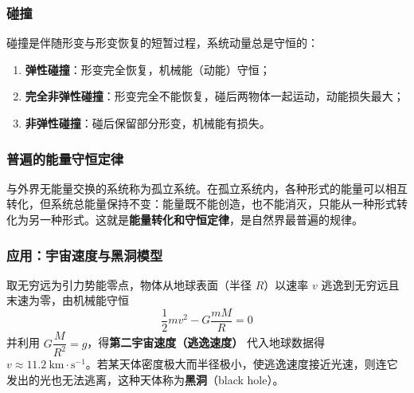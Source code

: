         \subsubsection{碰撞}
        碰撞是伴随形变与形变恢复的短暂过程，系统动量总是守恒的：
        \begin{enumerate}
            \item \textbf{弹性碰撞}：形变完全恢复，机械能（动能）守恒；
            \item \textbf{完全非弹性碰撞}：形变完全不能恢复，碰后两物体一起运动，动能损失最大；
            \item \textbf{非弹性碰撞}：碰后保留部分形变，机械能有损失。
        \end{enumerate}

        \subsubsection{普遍的能量守恒定律}
        与外界无能量交换的系统称为孤立系统。在孤立系统内，各种形式的能量可以相互转化，但系统总能量保持不变：能量既不能创造，也不能消灭，只能从一种形式转化为另一种形式。这就是\textbf{能量转化和守恒定律}，是自然界最普遍的规律。

        \subsubsection{应用：宇宙速度与黑洞模型}
        取无穷远为引力势能零点，物体从地球表面（半径 $R$）以速率 $v$ 逃逸到无穷远且末速为零，由机械能守恒
        \[
        \frac{1}{2}mv^{2}-G\frac{mM}{R}=0
        \]
        并利用 $G\dfrac{M}{R^{2}}=g$，得\textbf{第二宇宙速度（逃逸速度）}
        代入地球数据得 $v\approx11.2\ \mathrm{km\cdot s^{-1}}$。若某天体密度极大而半径极小，使逃逸速度接近光速，则连它发出的光也无法逃离，这种天体称为\textbf{黑洞}（black hole）。
